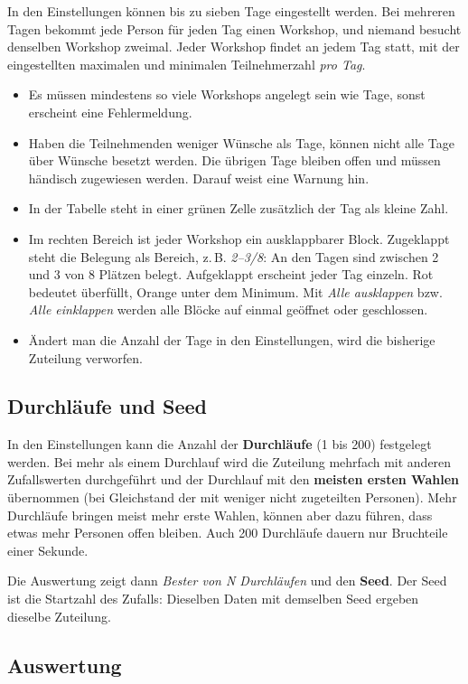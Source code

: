 \documentclass[a4paper,11pt]{article}
\begin{document}
In den Einstellungen können bis zu sieben Tage eingestellt werden. Bei mehreren Tagen bekommt jede Person für jeden Tag
einen Workshop, und niemand besucht denselben Workshop zweimal. Jeder Workshop findet an jedem Tag statt, mit der
eingestellten maximalen und minimalen Teilnehmerzahl \emph{pro Tag}.
\begin{itemize}
  \item Es müssen mindestens so viele Workshops angelegt sein wie Tage, sonst erscheint eine Fehlermeldung.
  \item Haben die Teilnehmenden weniger Wünsche als Tage, können nicht alle Tage über Wünsche besetzt werden. Die übrigen
  Tage bleiben offen und müssen händisch zugewiesen werden. Darauf weist eine Warnung hin.
  \item In der Tabelle steht in einer grünen Zelle zusätzlich der Tag als kleine Zahl.
  \item Im rechten Bereich ist jeder Workshop ein ausklappbarer Block. Zugeklappt steht die Belegung als Bereich, z.\,B.
  \emph{2--3/8}: An den Tagen sind zwischen 2 und 3 von 8 Plätzen belegt. Aufgeklappt erscheint jeder Tag einzeln. Rot
  bedeutet überfüllt, Orange unter dem Minimum. Mit \emph{Alle ausklappen} bzw. \emph{Alle einklappen} werden alle
  Blöcke auf einmal geöffnet oder geschlossen.
  \item Ändert man die Anzahl der Tage in den Einstellungen, wird die bisherige Zuteilung verworfen.
\end{itemize}

\subsection{Durchläufe und Seed}\label{sec:durchlaeufe}

In den Einstellungen kann die Anzahl der \textbf{Durchläufe} (1 bis 200) festgelegt werden. Bei mehr als einem Durchlauf
wird die Zuteilung mehrfach mit anderen Zufallswerten durchgeführt und der Durchlauf mit den \textbf{meisten ersten
Wahlen} übernommen (bei Gleichstand der mit weniger nicht zugeteilten Personen). Mehr Durchläufe bringen meist mehr erste
Wahlen, können aber dazu führen, dass etwas mehr Personen offen bleiben. Auch 200 Durchläufe dauern nur Bruchteile einer
Sekunde.

Die Auswertung zeigt dann \emph{Bester von N Durchläufen} und den \textbf{Seed}. Der Seed ist die Startzahl des Zufalls:
Dieselben Daten mit demselben Seed ergeben dieselbe Zuteilung.

\subsection{Auswertung}\label{sec:auswertung}
\end{document}

